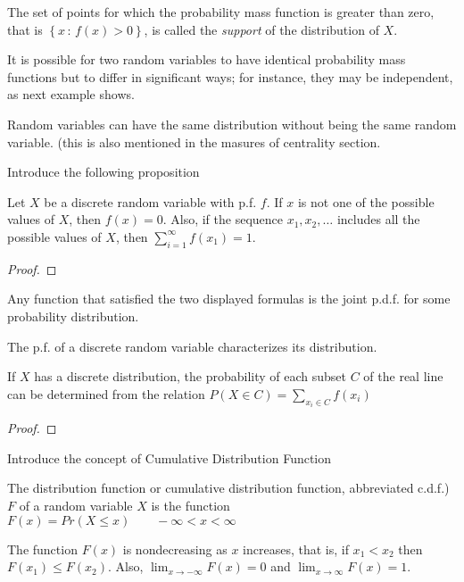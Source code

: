 The set of points for which the probability mass function is greater than zero, that is $\left\{ x \, : \, f \left( x \right) > 0 \right\}$, is called the \emph{support} of the distribution of $X$.

It is possible for two random variables to have identical probability mass functions but to differ in significant ways; for instance, they may be independent, as next example shows.

\begin{example}
{\color{red} Random variables can have the same distribution without being the same random variable. (this is also mentioned in the masures of centrality section}.
\end{example}


{\color{red} Introduce the following proposition}

\begin{proposition}
Let $X$ be a discrete random variable with p.f. $f$. If $x$ is not one of the possible values of $X$, then $f\left(x\right)=0$. Also, if the sequence $x_{1},x_{2},\ldots$ includes all the possible values of $X$, then $\sum_{i=1}^{\infty}f\left(x_{1}\right)=1$.
\end{proposition}
\begin{proof}
\end{proof}

{\color{red} Any function that satisfied the two displayed formulas is the joint p.d.f. for some probability distribution.}

{\color{red} The p.f. of a discrete random variable characterizes its distribution.}

\begin{proposition}
If $X$ has a discrete distribution, the probability of each subset $C$ of the real line can be determined from the relation $P\left(X\in C\right)=\sum_{x_{i}\in C}f\left(x_{i}\right)$
\end{proposition}
\begin{proof}
\end{proof}

{\color{red} Introduce the concept of Cumulative Distribution Function}

\begin{definition}
The distribution function or cumulative distribution function, abbreviated c.d.f.) $F$ of a random variable $X$ is the function $F(x)=Pr(X\leq x)\qquad-\infty<x<\infty$
\end{definition}

{\color{red}
The function $F\left(x\right)$ is nondecreasing as $x$ increases, that is, if $x_{1}<x_{2}$ then $F\left(x_{1}\right)\leq F\left(x_{2}\right)$. Also, $\lim_{x\rightarrow-\infty}F\left(x\right)=0$ and $\lim_{x\rightarrow\infty}F\left(x\right)=1$.
}

